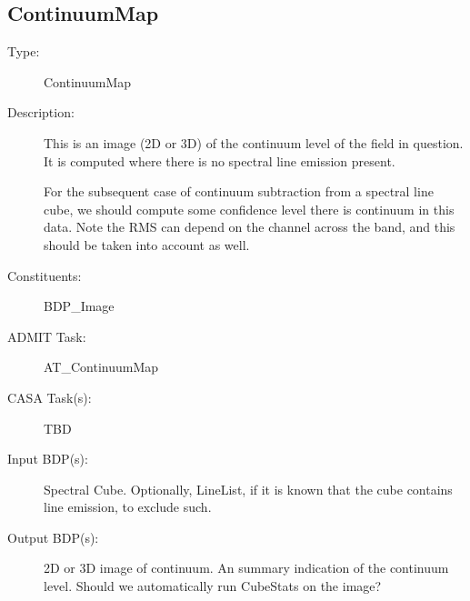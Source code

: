 \subsection{ContinuumMap}
\begin{description}
\item[Type:] ContinuumMap
\item[Description:] 
This is an image (2D or 3D) of the continuum level of the field in question.
It is computed where there is no spectral line emission present.  

For the subsequent case of continuum subtraction from a spectral line cube,
we should compute some confidence level there is continuum in this data.
Note the RMS can depend on the channel across the band, and this should
be taken into account as well.

\item[Constituents:] BDP\_Image

\item[ADMIT Task:] AT\_ContinuumMap

\item[CASA Task(s):] TBD

\item[Input BDP(s):] Spectral Cube. Optionally, LineList, if it is known that
the cube contains line emission, to exclude such.

\item[Output BDP(s):]  
  2D or 3D image of continuum.  
  An summary indication of the continuum level. Should we automatically
  run CubeStats on the image?
\end{description}
